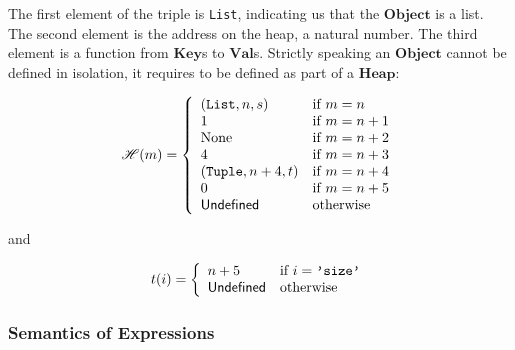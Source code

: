 
The first element of the triple is \texttt{List}, indicating us that the
\(\mathbf{Object}\) is a list. The second element is the address on the heap, a natural
number. The third element is a function from \(\mathbf{Key}\)s to \(\mathbf{Val}\)s.
Strictly speaking an \(\mathbf{Object}\) cannot be defined in isolation, it requires to be
defined as part of a \(\mathbf{Heap}\):

  \[\mathscr{H}(m) = \left\{
    \begin{array}{ll}
      (\texttt{List}, n, s) & \text{if } m = n \\
      1 & \text{if } m = n + 1 \\
      \text{None} & \text{if } m = n + 2 \\
      4 & \text{if } m = n + 3 \\
      (\texttt{Tuple}, n+4, t) & \text{if } m = n + 4 \\
      0 & \text{if } m = n + 5 \\
      \mathsf{Undefined} & \text{otherwise} \\
    \end{array}
  \right.\]

and

  \[t(i) = \left\{
    \begin{array}{ll}
      n + 5   & \text{if } i = \texttt{'size'} \\
      \mathsf{Undefined} & \text{otherwise} \\
    \end{array}
  \right.\]



\subsubsection*{Semantics of Expressions}

